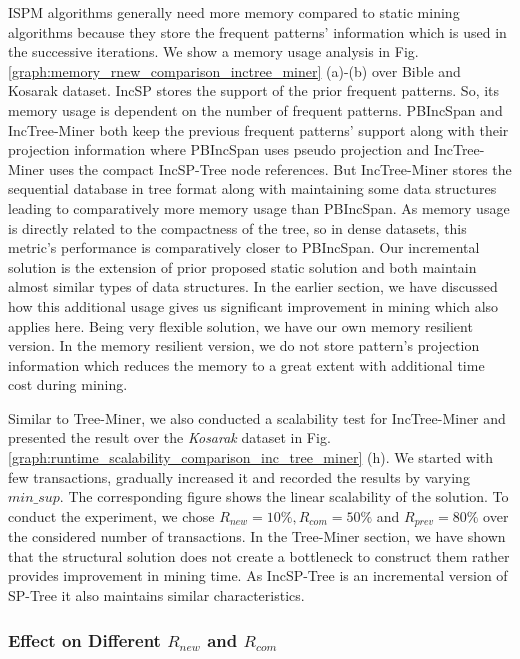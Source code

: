 ISPM algorithms generally need more memory compared to static mining algorithms because they store the frequent patterns' information which is used in the successive iterations. We show a memory usage analysis in Fig. \ref{graph:memory_rnew_comparison_inctree_miner} (a)-(b) over Bible and Kosarak dataset. IncSP stores the support of the prior frequent patterns. So, its memory usage is dependent on the number of frequent patterns. PBIncSpan and IncTree-Miner both keep the previous frequent patterns' support along with their projection information where PBIncSpan uses pseudo projection and IncTree-Miner uses the compact IncSP-Tree node references. But IncTree-Miner stores the sequential database in tree format along with maintaining some data structures leading to comparatively more memory usage than PBIncSpan. As memory usage is directly related to the compactness of the tree, so in dense datasets, this metric's performance is comparatively closer to PBIncSpan. Our incremental solution is the extension of prior proposed static solution and both maintain almost similar types of data structures. In the earlier section, we have discussed how this additional usage gives us significant improvement in mining which also applies here. Being very flexible solution, we have our own memory resilient version. In the memory resilient version, we do not store pattern's projection information which reduces the memory to a great extent with additional time cost during mining.

Similar to Tree-Miner, we also conducted a scalability test for IncTree-Miner and presented the result over the \textit{Kosarak} dataset in Fig. \ref{graph:runtime_scalability_comparison_inc_tree_miner} (h). We started with few transactions, gradually increased it and recorded the results by varying $min\_sup$. The corresponding figure shows the linear scalability of the solution. To conduct the experiment, we chose $R_{new}=10\%,R_{com}=50\%$ and $R_{prev}=80\%$ over the considered number of transactions. In the Tree-Miner section, we have shown that the structural solution does not create a bottleneck to construct them rather provides improvement in mining time. As IncSP-Tree is an incremental version of SP-Tree it also maintains similar characteristics.





\subsubsection{Effect on Different $R_{new}$ and $R_{com}$}

